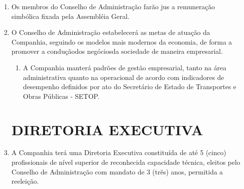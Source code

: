 \documentclass[a4paper,11pt]{report}
\begin{document}
\begin{enumerate}[resume, label=Art. \arabic*]
\begin{enumerate}[label=\roman*.]
\end{enumerate}

\item Os membros do Conselho de Administração farão jus a remuneração simbólica fixada pela Assembléia Geral.

\item O Conselho de Administração estabelecerá as metas de atuação da Companhia, seguindo os modelos mais modernos da economia, de forma a promover a conduçãodos negóciosda sociedade de maneira empresarial.

\begin{enumerate}[label= \S \arabic*]
    \item A Companhia manterá padrões de gestão empresarial, tanto na área administrativa quanto na operacional de acordo com indicadores de desempenho definidos por ato do Secretário de Estado de Transportes e Obras Públicas - SETOP.
\end{enumerate}

\section{DIRETORIA EXECUTIVA}

\item A Companhia terá uma Diretoria Executiva constituída de até 5 (cinco) profissionais de nível superior de reconhecida capacidade técnica, eleitos pelo Conselho de Administração com mandato de 3 (três) anos, permitida a reeleição.


\end{enumerate}
\end{document}
